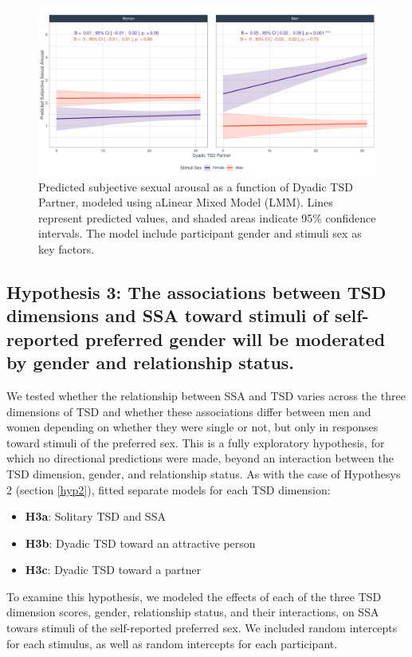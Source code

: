 \documentclass[
  bookmarksnumbered]{article}
\providecommand{\tightlist}{%
  \setlength{\itemsep}{0pt}\setlength{\parskip}{0pt}}
\begin{document}
\begin{figure}
\centering
\includegraphics{Sexual_Desire_Arousal_anonymous_files/figure-latex/fig-h2c-1.pdf}
\caption{\label{fig:fig-h2c}Predicted subjective sexual arousal as a function of Dyadic TSD Partner, modeled using aLinear Mixed Model (LMM). Lines represent predicted values, and shaded areas indicate 95\% confidence intervals. The model include participant gender and stimuli sex as key factors.}
\end{figure}

\subsection{Hypothesis 3: The associations between TSD dimensions and SSA toward stimuli of self-reported preferred gender will be moderated by gender and relationship status.}\label{hyp3}

We tested whether the relationship between SSA and TSD varies across the three dimensions of TSD and whether these associations differ between men and women depending on whether they were single or not, but only in responses toward stimuli of the preferred sex. This is a fully exploratory hypothesis, for which no directional predictions were made, beyond an interaction between the TSD dimension, gender, and relationship status. As with the case of Hypothesys 2 (section \ref{hyp2}), fitted separate models for each TSD dimension:

\begin{itemize}
\tightlist
\item
  \textbf{H3a}: Solitary TSD and SSA
\item
  \textbf{H3b}: Dyadic TSD toward an attractive person
\item
  \textbf{H3c}: Dyadic TSD toward a partner
\end{itemize}

To examine this hypothesis, we modeled the effects of each of the three TSD dimension scores, gender, relationship status, and their interactions, on SSA towars stimuli of the self-reported preferred sex. We included random intercepts for each stimulus, as well as random intercepts for each participant.
\end{document}
